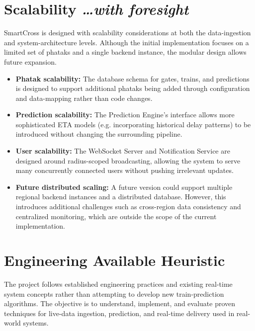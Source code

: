\documentclass[11pt,a4paper]{article}
\newcommand{\BvrHint}[1]{%
  {\normalfont\normalsize\itshape\hfill #1}}
\begin{document}
\section{Scalability %
\BvrHint{\ldots with foresight}}

SmartCross is designed with scalability considerations at both the data-ingestion and system-architecture levels. Although the initial implementation focuses on a limited set of phataks and a single backend instance, the modular design allows future expansion.

\begin{itemize}
    \item \textbf{Phatak scalability:} The database schema for gates, trains, and predictions is designed to support additional phataks being added through configuration and data-mapping rather than code changes.

    \item \textbf{Prediction scalability:} The Prediction Engine's interface allows more sophisticated ETA models (e.g. incorporating historical delay patterns) to be introduced without changing the surrounding pipeline.

    \item \textbf{User scalability:} The WebSocket Server and Notification Service are designed around radius-scoped broadcasting, allowing the system to serve many concurrently connected users without pushing irrelevant updates.

    \item \textbf{Future distributed scaling:} A future version could support multiple regional backend instances and a distributed database. However, this introduces additional challenges such as cross-region data consistency and centralized monitoring, which are outside the scope of the current implementation.
\end{itemize}

\section{Engineering Available Heuristic}

The project follows established engineering practices and existing real-time system concepts rather than attempting to develop new train-prediction algorithms. The objective is to understand, implement, and evaluate proven techniques for live-data ingestion, prediction, and real-time delivery used in real-world systems.
\end{document}
